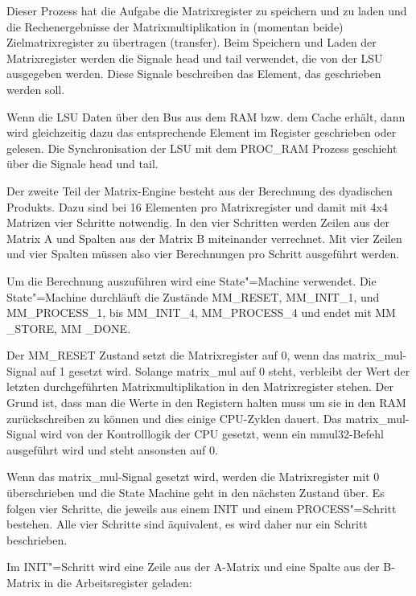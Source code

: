 
Dieser Prozess hat die Aufgabe die Matrixregister zu speichern und zu laden und die Rechenergebnisse der Matrixmultiplikation in (momentan beide) Zielmatrixregister zu übertragen (transfer). Beim Speichern und Laden der Matrixregister werden die Signale head und tail verwendet, die von der \gls{LSU} ausgegeben werden. Diese Signale beschreiben das Element, das geschrieben werden soll.

Wenn die \gls{LSU} Daten über den Bus aus dem RAM bzw. dem Cache erhält, dann wird gleichzeitig dazu das entsprechende Element im Register geschrieben oder gelesen. Die Synchronisation der \gls{LSU} mit dem PROC\_RAM Prozess geschieht über die Signale head und tail.

Der zweite Teil der Matrix-Engine besteht aus der Berechnung des dyadischen Produkts. Dazu sind bei 16 Elementen pro Matrixregister und damit mit 4x4 Matrizen vier Schritte notwendig. In den vier Schritten werden Zeilen aus der Matrix A und Spalten aus der Matrix B miteinander verrechnet. Mit vier Zeilen und vier Spalten müssen also vier Berechnungen pro Schritt ausgeführt werden.

Um die Berechnung auszuführen wird eine State"=Machine verwendet. Die State"=Machine durchläuft die Zustände MM\_RESET, MM\_INIT\_1, und MM\_PROCESS\_1, bis MM\_INIT\_4, MM\_PROCESS\_4 und endet mit MM \_STORE, MM \_DONE.

Der MM\_RESET Zustand setzt die Matrixregister auf 0, wenn das matrix\_mul-Signal auf 1 gesetzt wird. Solange matrix\_mul auf 0 steht, verbleibt der Wert der letzten durchgeführten Matrixmultiplikation in den Matrixregister stehen. Der Grund ist, dass man die Werte in den Registern halten muss um sie in den RAM zurückschreiben zu können und dies einige CPU-Zyklen dauert. Das matrix\_mul-Signal wird von der Kontrolllogik der CPU gesetzt, wenn ein mmul32-Befehl ausgeführt wird und steht ansonsten auf 0.

Wenn das matrix\_mul-Signal gesetzt wird, werden die Matrixregister mit 0 überschrieben und die State Machine geht in den nächsten Zustand über. Es folgen vier Schritte, die jeweils aus einem INIT und einem PROCESS"=Schritt bestehen. Alle vier Schritte sind äquivalent, es wird daher nur ein Schritt beschrieben.

Im INIT"=Schritt wird eine Zeile aus der A-Matrix und eine Spalte aus der B-Matrix in die Arbeitsregister geladen:

